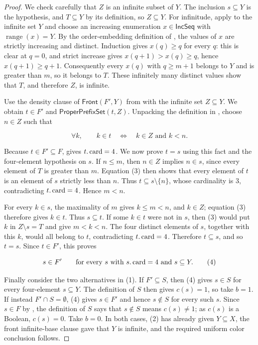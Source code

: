 \begin{proof}
We check carefully that $Z$ is an infinite subset of $Y$.  The inclusion
$s\subseteq Y$ is the hypothesis, and $T\subseteq Y$ by its definition,
so $Z\subseteq Y$.  For infinitude, apply
 to the infinite set $Y$ and choose an
increasing enumeration $x\in\mathsf{IncSeq}$ with
$\operatorname{range}(x)=Y$.  By the order-embedding definition of
, the values of $x$ are strictly increasing and
distinct.  Induction gives $x(q)\geq q$ for every $q$: this is clear at
$q=0$, and strict increase gives
$x(q+1)>x(q)\geq q$, hence $x(q+1)\geq q+1$.  Consequently every
$x(q)$ with $q\geq m+1$ belongs to $Y$ and is greater than $m$, so it
belongs to $T$.  These infinitely many distinct values show that $T$,
and therefore $Z$, is infinite.

Use the density clause of $\mathsf{Front}(F',Y)$ from
 with the infinite set $Z\subseteq Y$.  We obtain
$t\in F'$ and $\mathsf{ProperPrefixSet}(t,Z)$.  Unpacking the definition
in , choose $n\in Z$ such that

\[
\forall k,\qquad k\in t\quad\Longleftrightarrow\quad
k\in Z\text{ and }k<n.
\tag{3}
\]

Because $t\in F'\subseteq F$,  gives
$t.\mathop{\rm card}=4$.  We now prove $t=s$ using this fact and the
four-element hypothesis on $s$.  If $n\leq m$, then $n\in Z$ implies
$n\in s$, since every element of $T$ is greater than $m$.  Equation (3)
then shows that every element of $t$ is an element of $s$ strictly less
than $n$.  Thus $t\subseteq s\setminus\{n\}$, whose cardinality is
$3$, contradicting $t.\mathop{\rm card}=4$.  Hence $m<n$.

For every $k\in s$, the maximality of $m$ gives $k\leq m<n$, and
$k\in Z$; equation (3) therefore gives $k\in t$.  Thus $s\subseteq t$.
If some $k\in t$ were not in $s$, then (3) would put $k$ in $Z\setminus
s=T$ and give $m<k<n$.  The four distinct elements of $s$, together
with this $k$, would all belong to $t$, contradicting
$t.\mathop{\rm card}=4$.  Therefore $t\subseteq s$, and so $t=s$.
Since $t\in F'$, this proves

\[
s\in F'\qquad\text{for every }s\text{ with }s.\mathop{\rm card}=4
\text{ and }s\subseteq Y.
\tag{4}
\]

Finally consider the two alternatives in (1).  If $F'\subseteq S$, then
(4) gives $s\in S$ for every four-element $s\subseteq Y$.  The
definition of $S$ then gives $c(s)=1$, so take $b=1$.  If instead
$F'\cap S=\emptyset$, (4) gives $s\in F'$ and hence $s\notin S$ for
every such $s$.  Since $s\in F$ by
, the definition of $S$ says that
$s\notin S$ means $c(s)\ne1$; as $c(s)$ is a Boolean, $c(s)=0$.  Take
$b=0$.  In both cases, (2) has already given $Y\subseteq X$, the front
infinite-base clause gave that $Y$ is infinite, and the required uniform
color conclusion follows.
\end{proof}
